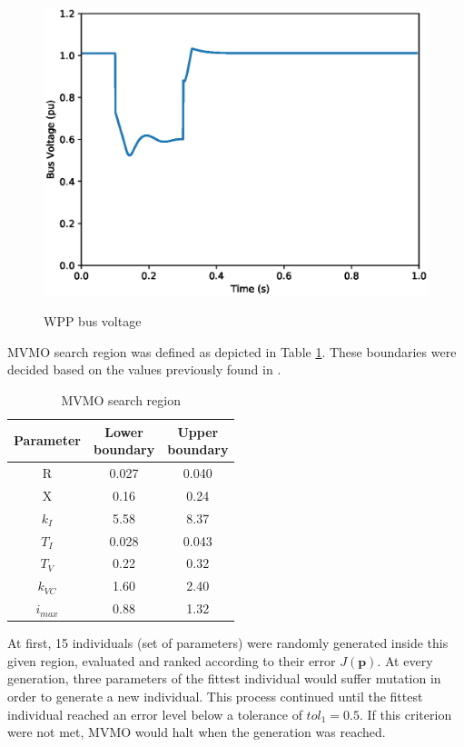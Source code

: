 \begin{figure}[!h]
	\centering
	\caption{WPP bus voltage}
	\includegraphics[scale=.7]{Images/bus_voltage.eps}
	\label{fig: WPP_voltage}
\end{figure}

MVMO search region was defined as depicted in Table \ref{tab: MVMO_boundaries}. These boundaries were decided based on the values previously found in \cite{Cari2015}.

\begin{table}[!h]
	\centering
	\caption{MVMO search region}
	\begin{tabular}{c|cc}
		Parameter & \shortstack{Lower \\ boundary} & \shortstack{Upper \\ boundary} \\\hline
		R & 0.027 & 0.040 \\
		X & 0.16 & 0.24 \\
		$k_{I}$ & 5.58 & 8.37 \\
		$T_{I}$ & 0.028 & 0.043 \\
		$T_{V}$ & 0.22 & 0.32 \\
		$k_{VC}$ & 1.60 & 2.40 \\
		$i_{max}$ & 0.88 & 1.32
	\end{tabular}
	\label{tab: MVMO_boundaries}
\end{table}

At first, 15 individuals (set of parameters) were randomly generated inside this given region, evaluated and ranked according to their error $J(\mathbf{p})$. At every generation, three parameters of the fittest individual would suffer mutation in order to generate a new individual. This process continued until the fittest individual reached an error level below a tolerance of $tol_{1} = 0.5$. If this criterion were not met, MVMO would halt when the  generation was reached.

